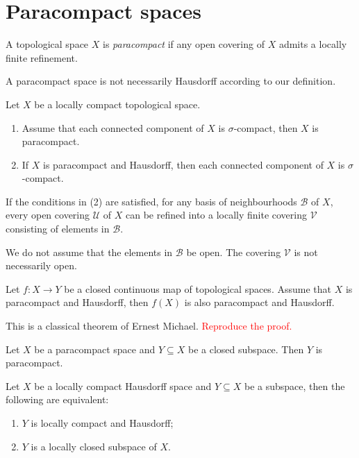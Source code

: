 \section{Paracompact spaces}

\begin{definition}
    A topological space $X$ is \emph{paracompact} if any open covering of $X$ admits a locally finite refinement.
\end{definition}
A paracompact space is not necessarily Hausdorff according to our definition.

\begin{proposition}\label{prop-paracptrefinement}
    Let $X$ be a locally compact topological space. 
    \begin{enumerate}
        \item Assume that each connected component of $X$ is $\sigma$-compact, then $X$ is paracompact.
        \item If $X$ is paracompact and Hausdorff, then each connected component of $X$ is $\sigma$-compact.
    \end{enumerate}
    If the conditions in (2) are satisfied, for any basis of neighbourhoods $\mathcal{B}$ of $X$, every open covering $\mathcal{U}$ of $X$ can be refined into a locally finite covering $\mathcal{V}$ consisting of elements in $\mathcal{B}$.
\end{proposition}
We do not assume that the elements in $\mathcal{B}$ be open. The covering $\mathcal{V}$ is not necessarily open.

\begin{thm}[Michael]\label{thm-Michael}
    Let $f:X\rightarrow Y$ be a closed continuous map of topological spaces. Assume that $X$ is paracompact and Hausdorff, then $f(X)$ is also paracompact and Hausdorff.
\end{thm}
This is a classical theorem of Ernest Michael. \textcolor{red}{Reproduce the proof.}

\begin{proposition}
    Let $X$ be a paracompact space and $Y\subseteq X$ be a closed subspace. Then $Y$ is paracompact.
\end{proposition}

\begin{proposition}
    Let $X$ be a locally compact Hausdorff space and $Y\subseteq X$ be a subspace, then the following are equivalent:
    \begin{enumerate}
        \item $Y$ is locally compact and Hausdorff;
        \item $Y$ is a locally closed subspace of $X$.
    \end{enumerate}
    
\end{proposition}

